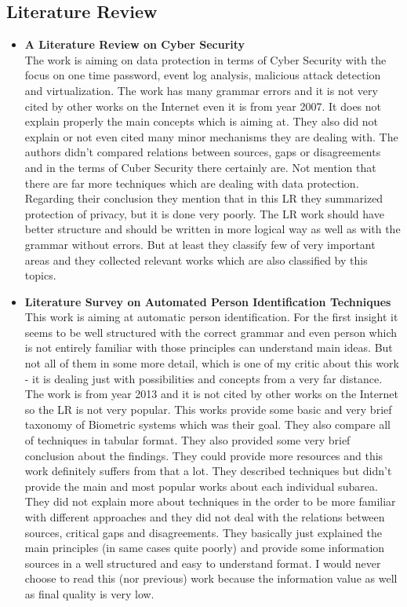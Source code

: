 \subsection*{Literature Review}
\begin{itemize}
	\item \textbf{A Literature Review on Cyber Security \cite{LR2}} \\
	The work is aiming on data protection in terms of Cyber Security with the focus on one time password, event log analysis, malicious attack detection and virtualization. The work has many grammar errors and it is not very cited by other works on the Internet even it is from year 2007. It does not explain properly the main concepts which is aiming at. They also did not explain or not even cited many minor mechanisms they are dealing with. The authors didn't compared relations between sources, gaps or disagreements and in the terms of Cuber Security there certainly are. Not mention that there are far more techniques which are dealing with data protection. Regarding their conclusion they mention that in this LR they summarized protection of privacy, but it is done very poorly. The LR work should have better structure and should be written in more logical way as well as with the grammar without errors. But at least they classify few of very important areas and they collected relevant works which are also classified by this topics. 
	 
	\item \textbf{Literature Survey on Automated Person Identification Techniques \cite{LR3}} \\
	This work is aiming at automatic person identification. For the first insight it seems to be well structured with the correct grammar and even person which is not entirely familiar with those principles can understand main ideas. But not all of them in some more detail, which is one of my critic about this work - it is dealing just with possibilities and concepts from a very far distance. The work is from year 2013 and it is not cited by other works on the Internet so the LR is not very popular. This works provide some basic and very brief taxonomy of Biometric systems which was their goal. They also compare all of techniques in tabular format. They also provided some very brief conclusion about the findings. They could provide more resources and this work definitely suffers from that a lot. They described techniques but didn't provide the main and most popular works about each individual subarea. They did not explain more about techniques in the order to be more familiar with different approaches and they did not deal with the relations between sources, critical gaps and disagreements. They basically just explained the main principles (in same cases quite poorly) and provide some information sources in a well structured and easy to understand format. I would never choose to read this (nor previous) work because the information value as well as final quality is very low.
	

\end{itemize}
